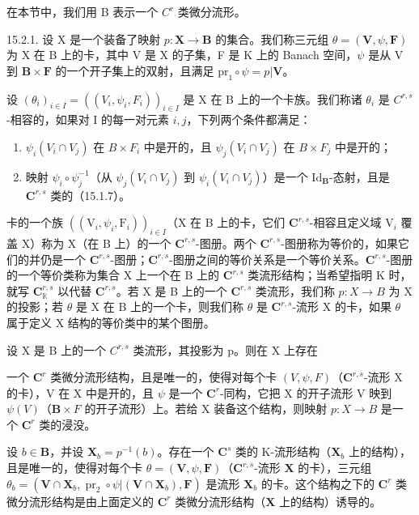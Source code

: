 在本节中，我们用 B 表示一个 \(C^{r}\) 类微分流形。

15.2.1. 设 X 是一个装备了映射 \(p: \mathbf{X} \to \mathbf{B}\) 的集合。我们称三元组 \(\theta = (\mathbf{V}, \psi, \mathbf{F})\) 为 X 在 B 上的卡，其中 V 是 X 的子集，F 是 K 上的 Banach 空间，\(\psi\) 是从 V 到 \(\mathbf{B} \times \mathbf{F}\) 的一个开子集上的双射，且满足 \(\mathrm{pr}_1 \circ \psi = p|\mathbf{V}\)。

设 \((\theta_{i})_{i\in I} = ((V_{i},\psi_{i},F_{i}))_{i\in I}\) 是 X 在 B 上的一个卡族。我们称诸 \(\theta_{i}\) 是 \(C^{r,s}\)-相容的，如果对 I 的每一对元素 \(i,j\)，下列两个条件都满足：

\begin{enumerate}
\def\labelenumi{\alph{enumi})}
\item
  \(\psi_i(V_i \cap V_j)\) 在 \(B \times F_i\) 中是开的，且 \(\psi_j(V_i \cap V_j)\) 在 \(B \times F_j\) 中是开的；
\item
  映射 \(\psi_i\circ\psi_j^{-1}\)（从 \(\psi_j(V_i\cap V_j)\) 到 \(\psi_i(V_i\cap V_j)\)）是一个 \(\mathrm{Id}_{\mathbf{B}}\)-态射，且是 \(\mathbf{C}^{r,s}\) 类的（15.1.7）。
\end{enumerate}

卡的一个族 \(((\mathrm{V}_i,\psi_i,\mathrm{F}_i))_{i\in I}\)（X 在 B 上的卡，它们 \(\mathbf{C}^{r,s}\)-相容且定义域 \(\mathrm{V}_i\) 覆盖 X）称为 X（在 B 上）的一个 \(\mathbf{C}^{r,s}\)-图册。两个 \(\mathbf{C}^{r,s}\)-图册称为等价的，如果它们的并仍是一个 \(\mathbf{C}^{r,s}\)-图册；\(\mathbf{C}^{r,s}\)-图册之间的等价关系是一个等价关系。\(\mathbf{C}^{r,s}\)-图册的一个等价类称为集合 X 上一个在 B 上的 \(\mathbf{C}^{r,s}\) 类流形结构；当希望指明 K 时，就写 \(\mathbf{C}_{\mathbb{K}}^{r,s}\) 以代替 \(\mathbf{C}^{r,s}\)。若 X 是 B 上的一个 \(\mathbf{C}^{r,s}\) 类流形，我们称 \(p\colon X\to B\) 为 X 的投影；若 \(\theta\) 是 X 在 B 上的一个卡，则我们称 \(\theta\) 是 \(\mathbf{C}^{r,s}\)-流形 X 的卡，如果 \(\theta\) 属于定义 X 结构的等价类中的某个图册。

设 X 是 B 上的一个 \(C^{r,s}\) 类流形，其投影为 p。则在 X 上存在

一个 \(\mathbf{C}^{r}\) 类微分流形结构，且是唯一的，使得对每个卡 \((V,\psi,F)\)（\(\mathbf{C}^{r,s}\)-流形 X 的卡），V 在 X 中是开的，且 \(\psi\) 是一个 \(\mathbf{C}^{r}\)-同构，它把 X 的开子流形 V 映到 \(\psi(V)\)（\(\mathbf{B}\times F\) 的开子流形）上。若给 X 装备这个结构，则映射 \(p:X\to B\) 是一个 \(\mathbf{C}^{r}\) 类的浸没。

设 \(b \in \mathbf{B}\)，并设 \(\mathbf{X}_b = p^{-1}(b)\)。存在一个 \(\mathbf{C}^s\) 类的 K-流形结构（\(\mathbf{X}_b\) 上的结构），且是唯一的，使得对每个卡 \(\theta = (\mathbf{V}, \psi, \mathbf{F})\)（\(\mathbf{C}^{r,s}\)-流形 \(\mathbf{X}\) 的卡），三元组 \(\theta_b = (\mathbf{V} \cap \mathbf{X}_b, \operatorname{pr}_2 \circ \psi | (\mathbf{V} \cap \mathbf{X}_b), \mathbf{F})\) 是流形 \(\mathbf{X}_b\) 的卡。这个结构之下的 \(\mathbf{C}^r\) 类微分流形结构是由上面定义的 \(\mathbf{C}^r\) 类微分流形结构（\(\mathbf{X}\) 上的结构）诱导的。
